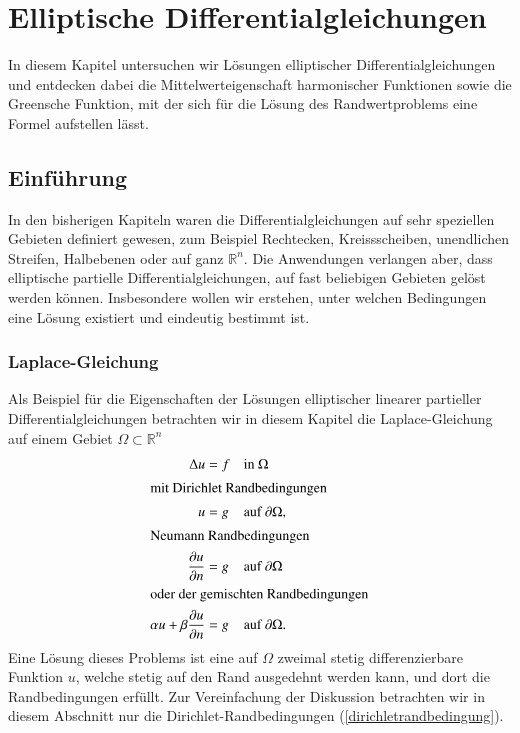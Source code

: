 %
%
%
\chapter{Elliptische Differentialgleichungen\label{chapter-elliptisch}}
In diesem Kapitel untersuchen wir Lösungen elliptischer Differentialgleichungen
und entdecken dabei die Mittelwerteigenschaft
harmonischer Funktionen sowie die Greensche Funktion, mit der sich für
die Lösung des Randwertproblems eine Formel aufstellen lässt.

\section{Einführung}
In den bisherigen Kapiteln waren die Differentialgleichungen auf sehr
speziellen Gebieten definiert gewesen, zum Beispiel Rechtecken, Kreissscheiben,
unendlichen Streifen, Halbebenen oder auf ganz $\mathbb R^n$. 
Die Anwendungen verlangen aber, dass elliptische partielle
Differentialgleichungen, auf fast beliebigen Gebieten gelöst werden können.
Insbesondere wollen wir erstehen, unter welchen Bedingungen eine
Lösung existiert und eindeutig bestimmt ist.

\subsection{Laplace-Gleichung}
Als Beispiel für die Eigenschaften der Lösungen
elliptischer linearer partieller Differentialgleichungen
betrachten wir in diesem Kapitel die Laplace-Gleichung
auf einem Gebiet $\Omega\subset\mathbb R^n$
\begin{align}
\Delta u&=f &&\text{in $\Omega$}
\label{elliptisch:laplaceequation}
\\
\intertext{mit Dirichlet Randbedingungen}
u&=g && \text{auf $\partial\Omega$},
\label{dirichletrandbedingung}
\\
\intertext{Neumann Randbedingungen}
\frac{\partial u}{\partial n}&=g && \text{auf $\partial\Omega$}
\\
\intertext{oder der gemischten Randbedingungen}
\alpha u + \beta\frac{\partial u}{\partial n}&=g && \text{auf $\partial\Omega$.}
\label{elliptisch:gemischt}
\end{align}
Eine Lösung dieses Problems ist eine auf $\Omega$
zweimal stetig differenzierbare
Funktion $u$, welche stetig auf den Rand ausgedehnt werden kann,
und dort die Randbedingungen erfüllt. Zur Vereinfachung der
Diskussion betrachten wir in diesem Abschnitt nur die
Dirichlet-Randbedingungen (\ref{dirichletrandbedingung}).

